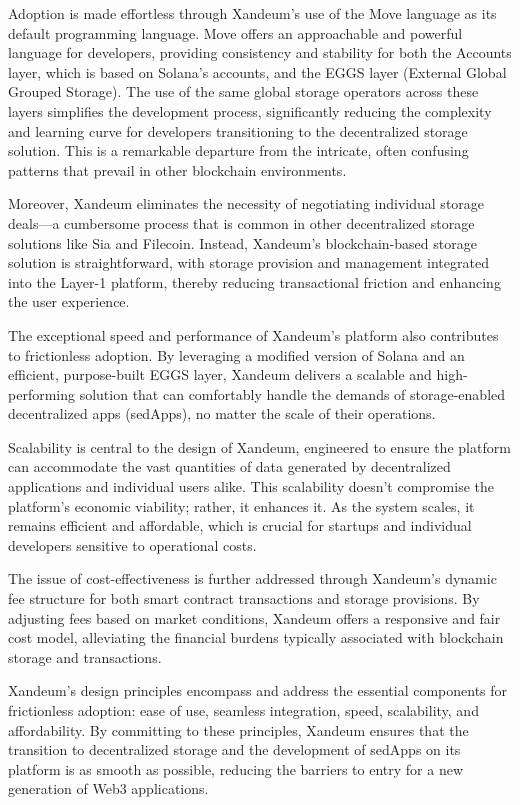 \documentclass[11pt]{article}   	%
\begin{document}
Adoption is made effortless through Xandeum's use of the Move language as its default programming language. Move offers an approachable and powerful language for developers, providing consistency and stability for both the Accounts layer, which is based on Solana's accounts, and the EGGS layer (External Global Grouped Storage). The use of the same global storage operators across these layers simplifies the development process, significantly reducing the complexity and learning curve for developers transitioning to the decentralized storage solution. This is a remarkable departure from the intricate, often confusing patterns that prevail in other blockchain environments.

Moreover, Xandeum eliminates the necessity of negotiating individual storage deals—a cumbersome process that is common in other decentralized storage solutions like Sia and Filecoin. Instead, Xandeum's blockchain-based storage solution is straightforward, with storage provision and management integrated into the Layer-1 platform, thereby reducing transactional friction and enhancing the user experience.

The exceptional speed and performance of Xandeum's platform also contributes to frictionless adoption. By leveraging a modified version of Solana and an efficient, purpose-built EGGS layer, Xandeum delivers a scalable and high-performing solution that can comfortably handle the demands of storage-enabled decentralized apps (sedApps), no matter the scale of their operations.

Scalability is central to the design of Xandeum, engineered to ensure the platform can accommodate the vast quantities of data generated by decentralized applications and individual users alike. This scalability doesn't compromise the platform's economic viability; rather, it enhances it. As the system scales, it remains efficient and affordable, which is crucial for startups and individual developers sensitive to operational costs.

The issue of cost-effectiveness is further addressed through Xandeum's dynamic fee structure for both smart contract transactions and storage provisions. By adjusting fees based on market conditions, Xandeum offers a responsive and fair cost model, alleviating the financial burdens typically associated with blockchain storage and transactions.

Xandeum's design principles encompass and address the essential components for frictionless adoption: ease of use, seamless integration, speed, scalability, and affordability. By committing to these principles, Xandeum ensures that the transition to decentralized storage and the development of sedApps on its platform is as smooth as possible, reducing the barriers to entry for a new generation of Web3 applications.
\end{document}
